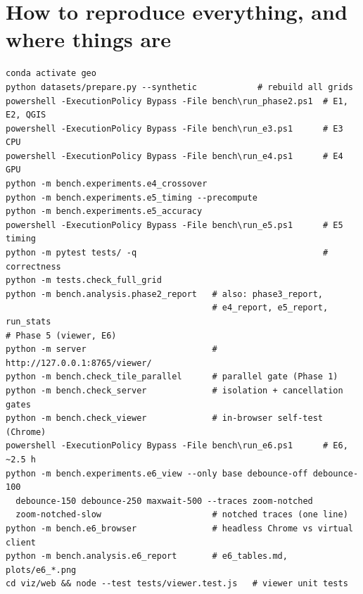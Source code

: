 ﻿\documentclass[11pt,a4paper]{article}
\begin{document}
\section{How to reproduce everything, and where things are}
\begin{verbatim}
conda activate geo
python datasets/prepare.py --synthetic            # rebuild all grids
powershell -ExecutionPolicy Bypass -File bench\run_phase2.ps1  # E1, E2, QGIS
powershell -ExecutionPolicy Bypass -File bench\run_e3.ps1      # E3 CPU
powershell -ExecutionPolicy Bypass -File bench\run_e4.ps1      # E4 GPU
python -m bench.experiments.e4_crossover
python -m bench.experiments.e5_timing --precompute
python -m bench.experiments.e5_accuracy
powershell -ExecutionPolicy Bypass -File bench\run_e5.ps1      # E5 timing
python -m pytest tests/ -q                                     # correctness
python -m tests.check_full_grid
python -m bench.analysis.phase2_report   # also: phase3_report,
                                         # e4_report, e5_report, run_stats
# Phase 5 (viewer, E6)
python -m server                         # http://127.0.0.1:8765/viewer/
python -m bench.check_tile_parallel      # parallel gate (Phase 1)
python -m bench.check_server             # isolation + cancellation gates
python -m bench.check_viewer             # in-browser self-test (Chrome)
powershell -ExecutionPolicy Bypass -File bench\run_e6.ps1      # E6, ~2.5 h
python -m bench.experiments.e6_view --only base debounce-off debounce-100
  debounce-150 debounce-250 maxwait-500 --traces zoom-notched
  zoom-notched-slow                      # notched traces (one line)
python -m bench.e6_browser               # headless Chrome vs virtual client
python -m bench.analysis.e6_report       # e6_tables.md, plots/e6_*.png
cd viz/web && node --test tests/viewer.test.js   # viewer unit tests
\end{verbatim}
\end{document}
